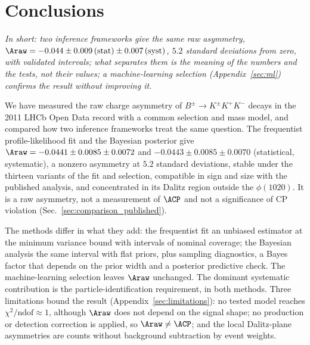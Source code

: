 \section{Conclusions}
\label{sec:conclusions}
\emph{In short: two inference frameworks give the same raw asymmetry, $\Araw=-0.044\pm0.009\,(\text{stat})\pm0.007\,(\text{syst})$, $5.2$ standard deviations from zero, with validated intervals; what separates them is the meaning of the numbers and the tests, not their values; a machine-learning selection (Appendix~\ref{sec:ml}) confirms the result without improving it.}

We have measured the raw charge asymmetry of $B^\pm\to K^\pm K^+K^-$ decays in the 2011 LHCb Open Data record with a common selection and mass model, and compared how two inference frameworks treat the same question. The frequentist profile-likelihood fit and the Bayesian posterior give $\Araw=-0.0441\pm0.0085\pm0.0072$ and $-0.0443\pm0.0085\pm0.0070$ (statistical, systematic), a nonzero asymmetry at $5.2$ standard deviations, stable under the thirteen variants of the fit and selection, compatible in sign and size with the published analysis, and concentrated in its Dalitz region outside the $\phi(1020)$. It is a raw asymmetry, not a measurement of $\ACP$ and not a significance of CP violation (Sec.~\ref{sec:comparison_published}).

The methods differ in what they add: the frequentist fit an unbiased estimator at the minimum variance bound with intervals of nominal coverage; the Bayesian analysis the same interval with flat priors, plus sampling diagnostics, a Bayes factor that depends on the prior width and a posterior predictive check. The machine-learning selection leaves $\Araw$ unchanged. The dominant systematic contribution is the particle-identification requirement, in both methods. Three limitations bound the result (Appendix~\ref{sec:limitations}): no tested model reaches $\chi^2/\mathrm{ndof}\approx1$, although $\Araw$ does not depend on the signal shape; no production or detection correction is applied, so $\Araw\neq\ACP$; and the local Dalitz-plane asymmetries are counts without background subtraction by event weights.
